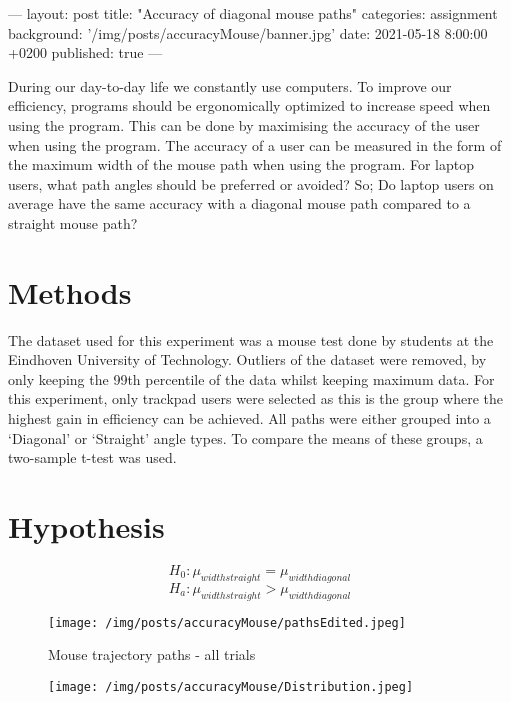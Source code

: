 ---
layout: post
title:  "Accuracy of diagonal mouse paths"
categories: assignment
background: '/img/posts/accuracyMouse/banner.jpg'
date:   2021-05-18 8:00:00 +0200
published: true
---
\usepackage{graphicx}
\usepackage{amsmath}
During our day-to-day life we constantly use computers. To improve our efficiency, programs should be ergonomically optimized to increase speed when using the program. This can be done by maximising the accuracy of the user when using the program. The accuracy of a user can be measured in the form of the maximum width of the mouse path when using the program. For laptop users, what path angles should be preferred or avoided? So; Do laptop users on average have the same accuracy with a diagonal mouse path compared to a straight mouse path? 

\section*{Methods}
The dataset used for this experiment was a mouse test done by students at the Eindhoven University of Technology. Outliers of the dataset were removed, by only keeping the 99th percentile of the data whilst keeping maximum data. For this experiment, only trackpad users were selected as this is the group where the highest gain in efficiency can be achieved. All paths were either grouped into a ‘Diagonal’ or ‘Straight’ angle types. To compare the means of these groups, a two-sample t-test was used.  

\section*{Hypothesis}
  $$H_0: \mu_{width straight} = \mu_{width diagonal}$$
  $$H_a: \mu_{width straight} > \mu_{width diagonal}$$

\begin{figure}
	\texttt{[image: /img/posts/accuracyMouse/pathsEdited.jpeg]}
	\caption{Mouse trajectory paths - all trials}
\end{figure}

\begin{figure}
    \texttt{[image: /img/posts/accuracyMouse/Distribution.jpeg]}
    \label{fig:dist}
\end{figure}



